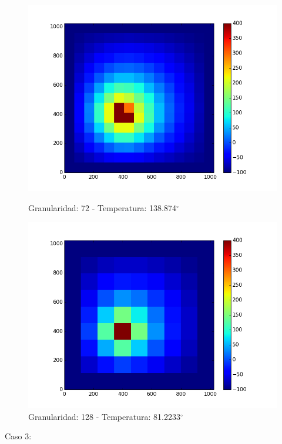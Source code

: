 \begin{figure}[htb]
\begin{center}
\includegraphics[scale=0.3]{imagenes/caso2_72.png} 
\caption{Granularidad: 72 - Temperatura: 138.874$^{\circ}$} 
        \end{center}
\endminipage\hfill
{}
\begin{center}
\includegraphics[scale=0.3]{imagenes/caso2_128.png} 
\caption{Granularidad: 128 - Temperatura: 81.2233$^{\circ}$} 
        \end{center}
\endminipage\hfill 
\end{figure}
\newpage
Caso 3:
